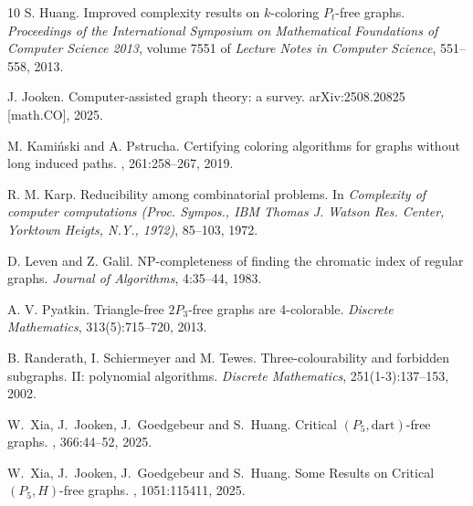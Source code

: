 \documentclass[11pt,a4paper]{article}
\theoremstyle{definition}
\begin{document}
\begin{thebibliography}{10}
         S. Huang.   
		Improved complexity results on $k$-coloring $P_t$-free graphs.
		{\em Proceedings of the International Symposium on Mathematical Foundations of Computer Science 2013}, 
		volume 7551 of {\em Lecture Notes in Computer Science}, 
		551--558, 2013.

        J. Jooken.
        \newblock Computer-assisted graph theory: a survey.
        \newblock arXiv:2508.20825 [math.CO], 2025.

        M. Kami\'{n}ski and A. Pstrucha. 
        \newblock Certifying coloring algorithms for graphs without long induced paths. 
        , 261:258--267, 2019.

         R. M. Karp.   
		Reducibility among combinatorial problems.
		In {\em Complexity of computer computations (Proc. Sympos., IBM Thomas J. Watson Res.
Center, Yorktown Heigts, N.Y., 1972)}, 85--103, 1972.



         D. Leven and Z. Galil. 
		NP-completeness of finding the chromatic index of regular graphs.
		{\em Journal of Algorithms}, 4:35--44, 1983. 


        A. V. Pyatkin. 
		Triangle-free $2P_3$-free graphs are 4-colorable.
		{\em Discrete Mathematics}, 313(5):715--720, 2013. 
        
        
        B. Randerath, I. Schiermeyer and M. Tewes. 
		Three-colourability and forbidden subgraphs. II: polynomial algorithms.
		{\em Discrete Mathematics}, 251(1-3):137--153, 2002. 
        
       W.~Xia, J.~Jooken, J.~Goedgebeur and S.~Huang.
       \newblock Critical $(P_5,\text{dart})$-free graphs.
       , 366:44--52, 2025.

       W.~Xia, J.~Jooken, J.~Goedgebeur and S.~Huang.
       \newblock Some Results on Critical $(P_5,H)$-free graphs.
        , 1051:115411, 2025.
\end{thebibliography}
        
\end{document}

